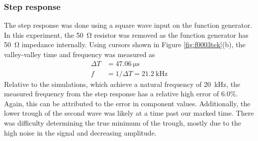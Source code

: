 \documentclass{report}
\begin{document}
\subsubsection{Step response}
The step response was done using a square wave input on the function generator. In this experiment, the \SI{50}{\ohm} resistor was removed as the function generator has \SI{50}{\ohm} impedance internally. Using cursors shown in Figure \ref{fig:f0003tek}(b), the valley-valley time and frequency was measured as \begin{align*}
	\Delta T & = \SI{47.06}{\us} \\
	f & = 1 / \Delta T = \SI{21.2}{\kHz}
\end{align*}
Relative to the simulations, which achieve a natural frequency of \SI{20}{\kHz}, the measured frequency from the step response has a relative high error of 6.0\%. Again, this can be attributed to the error in component values. Additionally, the lower trough of the second wave was likely at a time past our marked time. There was difficulty determining the true minimum of the trough, mostly due to the high noise in the signal and decreasing amplitude.
\end{document}

